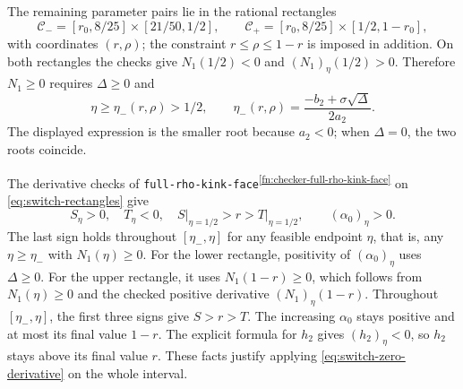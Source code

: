 \documentclass[11pt]{article}
\theoremstyle{remark}
\theoremstyle{plain}
\begin{document}
The remaining parameter pairs lie in the rational rectangles
\begin{equation}
 \mathcal C_-=[r_0,8/25]\times[21/50,1/2],\qquad
 \mathcal C_+=[r_0,8/25]\times[1/2,1-r_0],
 \label{eq:switch-rectangles}
\end{equation}
with coordinates $(r,\rho)$; the constraint $r\le\rho\le1-r$ is
imposed in addition. On both rectangles the checks give
$N_1(1/2)<0$ and $(N_1)_\eta(1/2)>0$.
Therefore $N_1\ge0$ requires $\Delta\ge0$ and
\begin{equation}
 \eta\ge\eta_-(r,\rho)>1/2,\qquad
 \eta_-(r,\rho)=\frac{-b_2+\sigma\sqrt\Delta}{2a_2}.
 \label{eq:switch-smaller-root}
\end{equation}
The displayed expression is the smaller root because $a_2<0$;
when $\Delta=0$, the two roots coincide.

The derivative checks of \nolinkurl{full-rho-kink-face}\textsuperscript{\ref{fn:checker-full-rho-kink-face}} on
\eqref{eq:switch-rectangles} give
\begin{equation}
 S_\eta>0,\quad T_\eta<0,\quad \left.S\right|_{\eta=1/2}>r>\left.T\right|_{\eta=1/2},\qquad
 (\alpha_0)_\eta>0.
 \label{eq:first-switch-interval-signs}
\end{equation}
The last sign holds throughout $[\eta_-,\eta]$ for any feasible
endpoint $\eta$, that is, any $\eta\ge\eta_-$ with $N_1(\eta)\ge0$. For the lower rectangle, positivity of $(\alpha_0)_\eta$ uses
$\Delta\ge0$. For the upper rectangle, it uses
$N_1(1-r)\ge0$, which follows from $N_1(\eta)\ge0$ and the
checked positive derivative $(N_1)_\eta(1-r)$.
Throughout $[\eta_-,\eta]$, the first three signs give $S>r>T$.
The increasing $\alpha_0$ stays positive and at most its final value
$1-r$. The explicit formula for $h_2$ gives $(h_2)_\eta<0$, so
$h_2$ stays above its final value $r$.
These facts justify applying \eqref{eq:switch-zero-derivative}
on the whole interval.
\end{document}
